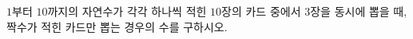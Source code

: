 \hspace*{2mm}\begin{minipage}[t]{\dimexpr\linewidth-2mm\relax}\vspace{0pt}
$1$부터 $10$까지의 자연수가 각각 하나씩 적힌 $10$장의 카드 중에서 $3$장을 동시에 뽑을 때, 짝수가 적힌 카드만 뽑는 경우의 수를 구하시오.\end{minipage}
